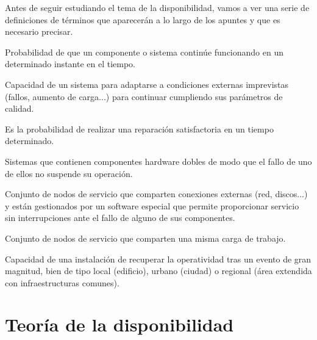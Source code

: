 \documentclass{apuntes}[nochap]
\begin{document}
Antes de seguir estudiando el tema de la disponibilidad, vamos a ver una serie de definiciones de términos que aparecerán a lo largo de los apuntes y que es necesario precisar.

\begin{defn}
Probabilidad de que un componente o sistema continúe funcionando en un determinado instante en el tiempo.
\end{defn}

\begin{defn}
Capacidad de un sistema para adaptarse a
condiciones externas imprevistas (fallos, aumento de carga...) para continuar cumpliendo sus parámetros de calidad.
\end{defn}

\begin{defn}
Es la probabilidad de realizar una reparación satisfactoria en un tiempo determinado.
\end{defn}

\begin{defn}
Sistemas que contienen
componentes hardware dobles de modo que el fallo de uno de ellos no suspende su
operación.
\end{defn}
\newpage
\begin{defn}
Conjunto de nodos de servicio que comparten conexiones externas (red, discos...) y están gestionados por un software especial que permite proporcionar servicio sin interrupciones ante el fallo de alguno de sus componentes.
\end{defn}

\begin{defn}
Conjunto de nodos de servicio que comparten una misma carga de trabajo.
\end{defn}

\begin{defn}
Capacidad de una instalación de
recuperar la operatividad tras un evento de gran magnitud, bien de tipo local (edificio), urbano (ciudad) o regional (área extendida con infraestructuras comunes).
\end{defn}

\section{Teoría de la disponibilidad}
\end{document}
